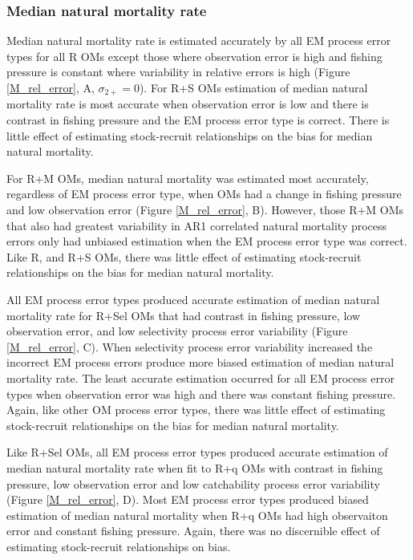 \documentclass[
  12pt,
]{article}
\begin{document}
\hypertarget{median-natural-mortality-rate}{%
\subsubsection*{Median natural mortality
rate}\label{median-natural-mortality-rate}}

Median natural mortality rate is estimated accurately by all EM process
error types for all R OMs except those where observation error is high
and fishing pressure is constant where variability in relative errors is
high (Figure \ref{M_rel_error}, A, \(\sigma_{2+} = 0\)). For R+S OMs
estimation of median natural mortality rate is most accurate when
observation error is low and there is contrast in fishing pressure and
the EM process error type is correct. There is little effect of
estimating stock-recruit relationships on the bias for median natural
mortality.

For R+M OMs, median natural mortality was estimated most accurately,
regardless of EM process error type, when OMs had a change in fishing
pressure and low observation error (Figure \ref{M_rel_error}, B).
However, those R+M OMs that also had greatest variability in AR1
correlated natural mortality process errors only had unbiased estimation
when the EM process error type was correct. Like R, and R+S OMs, there
was little effect of estimating stock-recruit relationships on the bias
for median natural mortality.

All EM process error types produced accurate estimation of median
natural mortality rate for R+Sel OMs that had contrast in fishing
pressure, low observation error, and low selectivity process error
variability (Figure \ref{M_rel_error}, C). When selectivity process
error variability increased the incorrect EM process errors produce more
biased estimation of median natural mortality rate. The least accurate
estimation occurred for all EM process error types when observation
error was high and there was constant fishing pressure. Again, like
other OM process error types, there was little effect of estimating
stock-recruit relationships on the bias for median natural mortality.

Like R+Sel OMs, all EM process error types produced accurate estimation
of median natural mortality rate when fit to R+q OMs with contrast in
fishing pressure, low observation error and low catchability process
error variability (Figure \ref{M_rel_error}, D). Most EM process error
types produced biased estimation of median natural mortality when R+q
OMs had high observaiton error and constant fishing pressure. Again,
there was no discernible effect of estimating stock-recruit
relationships on bias.
\end{document}

